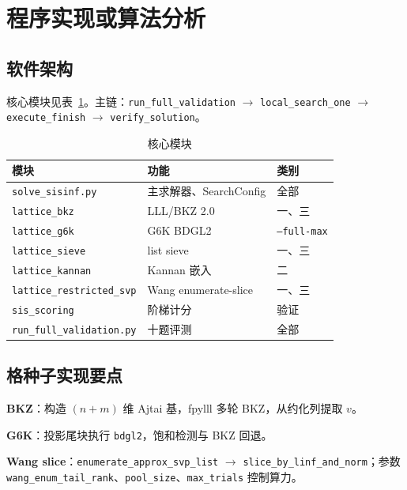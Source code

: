 \documentclass[12pt,a4paper]{ctexart}
\begin{document}
\section{程序实现或算法分析}

\subsection{软件架构}

核心模块见表~\ref{tab:modules}。主链：\texttt{run\_full\_validation} $\to$ \texttt{local\_search\_one} $\to$ \texttt{execute\_finish} $\to$ \texttt{verify\_solution}。

\begin{table}[htbp]
  \centering
  \caption{核心模块}
  \label{tab:modules}
  \small
  \begin{tabular}{p{3.6cm}p{4.4cm}p{4.8cm}}
    \toprule
    模块 & 功能 & 类别 \\
    \midrule
    \texttt{solve\_sisinf.py} & 主求解器、SearchConfig & 全部 \\
    \texttt{lattice\_bkz} & LLL/BKZ 2.0 & 一、三 \\
    \texttt{lattice\_g6k} & G6K BDGL2 & \texttt{--full-max} \\
    \texttt{lattice\_sieve} & list sieve & 一、三 \\
    \texttt{lattice\_kannan} & Kannan 嵌入 & 二 \\
    \texttt{lattice\_restricted\_svp} & Wang enumerate-slice & 一、三 \\
    \texttt{sis\_scoring} & 阶梯计分 & 验证 \\
    \texttt{run\_full\_validation.py} & 十题评测 & 全部 \\
    \bottomrule
  \end{tabular}
\end{table}

\subsection{格种子实现要点}

\textbf{BKZ}：构造 $(n{+}m)$ 维 Ajtai 基，fpylll 多轮 BKZ，从约化列提取 $v$。

\textbf{G6K}：投影尾块执行 \texttt{bdgl2}，饱和检测与 BKZ 回退。

\textbf{Wang slice}：\texttt{enumerate\_approx\_svp\_list} $\to$ \texttt{slice\_by\_linf\_and\_norm}；参数 \texttt{wang\_enum\_tail\_rank}、\texttt{pool\_size}、\texttt{max\_trials} 控制算力。
\end{document}
